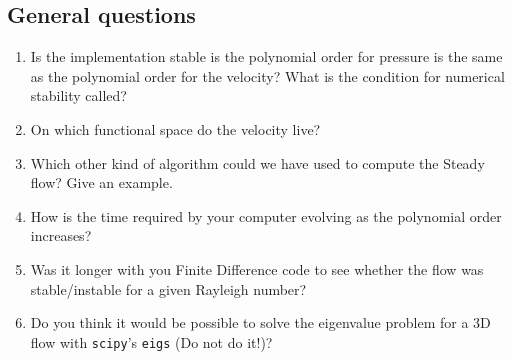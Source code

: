 \documentclass[12pt,a4paper]{scrartcl}
\begin{document}
\subsection{General questions}
\begin{enumerate}

\item Is the implementation stable is the polynomial order for pressure is the same as the polynomial order for the velocity? What is the condition for numerical stability called? 
\item On which functional space do the velocity live? 
\item Which other kind of algorithm could we have used to compute the Steady flow? Give an example.
\item How is the time required by your computer evolving as the polynomial order increases?
\item Was it longer with you Finite Difference code to see whether the flow was stable/instable for a given Rayleigh number?
\item Do you think it would be possible to solve the eigenvalue problem for a 3D flow with \texttt{scipy}'s \texttt{eigs} (Do not do it!)?

\end{enumerate}
\end{document}
